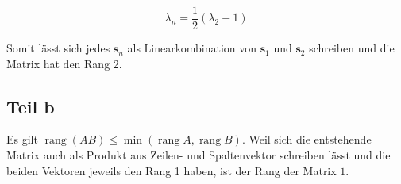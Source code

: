 \documentclass[a4paper,german,12pt,smallheadings]{scrartcl}
\begin{document}
\begin{equation*}
  \lambda_n = \frac{1}{2} (\lambda_2+1)
\end{equation*}

Somit lässt sich jedes $\mathbf{s}_n$ als Linearkombination von $\mathbf{s}_1$
und $\mathbf{s}_2$ schreiben und die Matrix hat den Rang 2.

\subsection{Teil b}

Es gilt $\operatorname{rang}(AB) \leq \operatorname{min}(\operatorname{rang} A,
\operatorname{rang} B)$. Weil sich die entstehende Matrix auch als Produkt aus
Zeilen- und Spaltenvektor schreiben lässt und die beiden Vektoren jeweils den
Rang 1 haben, ist der Rang der Matrix $1$.
\end{document}
